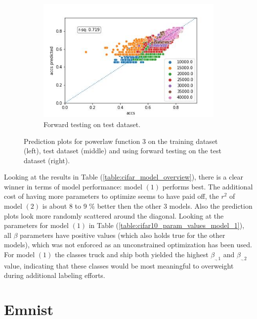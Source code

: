 \documentclass{article} %
\begin{document}
\begin{figure}
    \begin{subfigure}{.33\textwidth}
        \centering
        \includegraphics[width=.8\linewidth]{cifar10/powerlaw_all_epochs_accs_hat_total_n_arctan_epoch_arctan_val_forward_testing.jpg}
        \caption{Forward testing on test dataset.}
        \label{fig:powerlaw_acc_total_n_arctan_epoch_arctan_forward_val}
    \end{subfigure}
    \caption{Prediction plots for powerlaw function 3 on the training dataset (left), test dataset (middle) and using forward testing on the test dataset (right).}
    \label{fig:powerlaw_prediction_plot_fct_3}
\end{figure}


Looking at the results in Table (\ref{table:cifar_model_overview}), there is a clear winner in terms of model performance: model $(1)$ performs best.
The additional cost of having more parameters to optimize seems to have paid off, the $r^2$ of model $(2)$ is about 8 to 9 \% better then the other 3 models.
Also the prediction plots look more randomly scattered around the diagonal.
Looking at the parameters for model $(1)$ in Table (\ref{table:cifar10_param_values_model_1}), all $\beta$ parameters have positive values (which also holds true for the other models), which was not enforced as an unconstrained optimization has been used.
For model $(1)$ the classes truck and ship both yielded the highest $\beta_{.,1}$ and $\beta_{.,2}$ value, indicating that these classes would be most meaningful to overweight during additional labeling efforts.

\section{Emnist}
\end{document}
